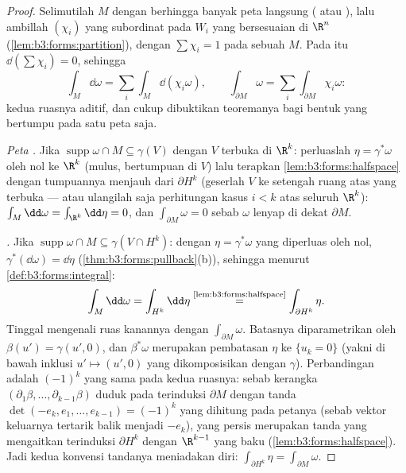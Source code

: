 \begin{proof}
Selimutilah  $M$ dengan berhingga banyak peta langsung
( atau ), lalu ambillah 
$(\chi_i)$ yang subordinat pada  $W_i$ yang bersesuaian
di $\R^n$ (\cref{lem:b3:forms:partition}), dengan $\sum\chi_i
= 1$ pada sebuah  $M$. Pada  itu
$\dd(\sum\chi_i) = 0$, sehingga
\[
\int_M\dd\omega = \sum_i\int_M\dd(\chi_i\omega),
\qquad
\int_{\partial M}\omega =
\sum_i\int_{\partial M}\chi_i\omega :
\]
kedua ruasnya aditif, dan cukup dibuktikan
teoremanya bagi bentuk yang bertumpu pada satu peta saja.

\emph{Peta .} Jika $\operatorname{supp}\omega \cap M
\subseteq \gamma(V)$ dengan $V$ terbuka di $\R^k$: perluaslah $\eta =
\gamma^*\omega$ oleh nol ke $\R^k$ (mulus, bertumpuan 
di $V$) lalu terapkan \cref{lem:b3:forms:halfspace} dengan
tumpuannya menjauh dari $\partial H^k$ (geserlah $V$ ke
setengah ruang atas yang terbuka --- atau ulangilah saja perhitungan kasus $i < k$
atas seluruh $\R^k$): $\int_M\dd\omega =
\int_{\R^k}\dd\eta = 0$, dan $\int_{\partial M}\omega = 0$
sebab $\omega$ lenyap di dekat $\partial M$.

\emph{.} Jika $\operatorname{supp}\omega\cap M
\subseteq \gamma(V \cap H^k)$: dengan $\eta = \gamma^*\omega$
yang diperluas oleh nol,
$\gamma^*(\dd\omega) = \dd\eta$
(\cref{thm:b3:forms:pullback}(b)), sehingga menurut
\cref{def:b3:forms:integral}:
\[
\int_M\dd\omega = \int_{H^k}\dd\eta
\overset{\text{\cref{lem:b3:forms:halfspace}}}{=}
\int_{\partial H^k}\eta .
\]
Tinggal mengenali ruas kanannya dengan $\int_{\partial
M}\omega$. Batasnya diparametrikan oleh $\beta(u') =
\gamma(u', 0)$, dan $\beta^*\omega$ merupakan pembatasan
$\eta$ ke $\{u_k = 0\}$ (yakni  di bawah inklusi $u'
\mapsto (u', 0)$ yang dikomposisikan dengan $\gamma$). Perbandingan
 adalah $(-1)^k$ yang sama pada kedua ruasnya: sebab kerangka
$(\partial_1\beta, \dots, \partial_{k-1}\beta)$ duduk pada
 terinduksi $\partial M$ dengan tanda
$\det(-e_k, e_1, \dots, e_{k-1}) = (-1)^k$ yang dihitung pada
petanya (sebab vektor keluarnya tertarik balik menjadi $-e_k$), yang persis
merupakan tanda yang mengaitkan  terinduksi $\partial H^k$
dengan $\R^{k-1}$ yang baku
(\cref{lem:b3:forms:halfspace}). Jadi kedua konvensi tandanya
meniadakan diri:
$\int_{\partial H^k}\eta = \int_{\partial M}\omega$.
\end{proof}


